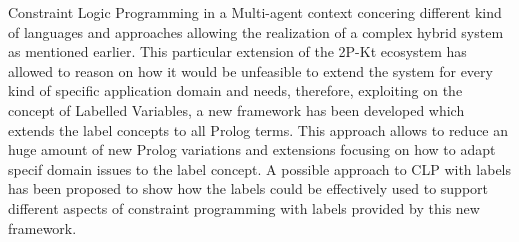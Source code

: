 Constraint Logic Programming in a Multi-agent context concering different kind of languages and approaches allowing the realization of a complex hybrid system as mentioned earlier.\newline\newline
This particular extension of the 2P-Kt ecosystem has allowed to reason on how it would be unfeasible to extend the system for every kind of
specific application domain and needs, therefore, exploiting on the concept of Labelled Variables, a new framework has been
developed which extends the label concepts to all Prolog terms. This approach allows to reduce an huge amount of new Prolog variations and extensions
focusing on how to adapt specif domain issues to the label concept.\newline\newline
A possible approach to CLP with labels has been proposed to show how the labels could be effectively used to support different aspects of
constraint programming with labels provided by this new framework.

